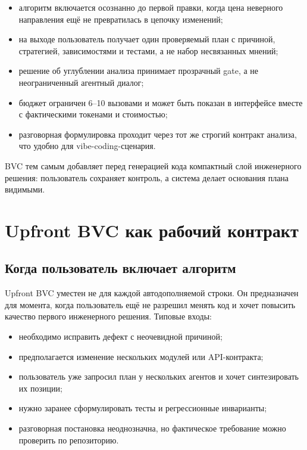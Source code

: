 \documentclass[11pt]{article}
\begin{document}
\begin{resultbox}
\begin{itemize}
  \item алгоритм включается осознанно до первой правки, когда цена неверного
        направления ещё не превратилась в цепочку изменений;
  \item на выходе пользователь получает один проверяемый план с причиной,
        стратегией, зависимостями и тестами, а не набор несвязанных мнений;
  \item решение об углублении анализа принимает прозрачный gate, а не
        неограниченный агентный диалог;
  \item бюджет ограничен 6--10 вызовами и может быть показан в интерфейсе
        вместе с фактическими токенами и стоимостью;
  \item разговорная формулировка проходит через тот же строгий контракт
        анализа, что удобно для vibe-coding-сценария.
\end{itemize}
BVC тем самым добавляет перед генерацией кода компактный слой инженерного
решения: пользователь сохраняет контроль, а система делает основания плана
видимыми.
\end{resultbox}

\section{Upfront BVC как рабочий контракт}

\subsection{Когда пользователь включает алгоритм}

Upfront BVC уместен не для каждой автодополняемой строки. Он предназначен
для момента, когда пользователь ещё не разрешил менять код и хочет повысить
качество первого инженерного решения. Типовые входы:
\begin{itemize}
  \item необходимо исправить дефект с неочевидной причиной;
  \item предполагается изменение нескольких модулей или API-контракта;
  \item пользователь уже запросил план у нескольких агентов и хочет
        синтезировать их позиции;
  \item нужно заранее сформулировать тесты и регрессионные инварианты;
  \item разговорная постановка неоднозначна, но фактическое требование можно
        проверить по репозиторию.
\end{itemize}
\end{document}
